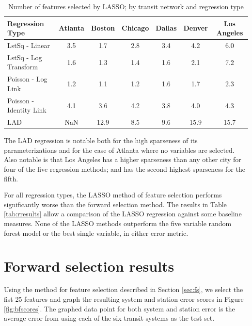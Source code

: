 \documentclass[11pt]{report}
\begin{document}
\begin{table}[H]
\begingroup\fontsize{10}{15}\selectfont
\centering
\begin{tabular}{l|cccccc}
Regression Type&Atlanta&Boston&Chicago&Dallas&Denver&Los Angeles\\
\midrule
LstSq - Linear&3.5&1.7&2.8&3.4&4.2&6.0\\
LstSq - Log Transform&1.6&1.3&1.4&1.6&2.1&7.2\\
Poisson - Log Link&1.2&1.1&1.2&1.6&1.7&2.3\\
Poisson - Identity Link&4.1&3.6&4.2&3.8&4.0&4.3\\
LAD&NaN&12.9&8.5&9.6&15.9&15.7\\
\end{tabular}
\caption{Number of features selected by LASSO; by transit network and regression type}\label{tab:lassoFeatSparse}
\endgroup
\end{table}

The LAD regression is notable both for the high sparseness of its parameterizations and for the case of Atlanta where no variables are selected. Also notable is that Los Angeles has a higher sparseness than any other city for four of the five regression methods; and has the second highest sparseness for the fifth.


For all regression types, the LASSO method of feature selection performs significantly worse than the forward selection method.  The results in Table \ref{tab:rresults} allow a comparison of the LASSO regression against some baseline measures. None of the LASSO methods outperform the five variable random forest model or the best single variable, in either error metric. 


\section{Forward selection results}

Using the method for feature selection described in Section \ref{sec:fs}, we select the fist 25 features and graph the resulting system and station error scores in Figure \ref{fig:bfscores}. The graphed data point for both system and station error is the average error from using each of the six transit systems as the test set. 
\end{document}
